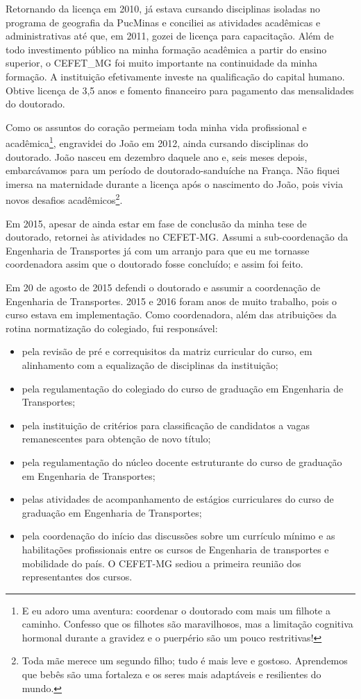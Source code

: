 \documentclass[
]{book}
\begin{document}
Retornando da licença em 2010, já estava cursando disciplinas isoladas
no programa de geografia da PucMinas e conciliei as atividades
acadêmicas e administrativas até que, em 2011, gozei de licença para
capacitação. Além de todo investimento público na minha formação
acadêmica a partir do ensino superior, o CEFET\_MG foi muito importante
na continuidade da minha formação. A instituição efetivamente investe na
qualificação do capital humano. Obtive licença de 3,5 anos e fomento
financeiro para pagamento das mensalidades do doutorado.

Como os assuntos do coração permeiam toda minha vida profissional e
acadêmica\footnote{E eu adoro uma aventura: coordenar o doutorado com mais
  um filhote a caminho. Confesso que os filhotes são maravilhosos, mas
  a limitação cognitiva hormonal durante a gravidez e o puerpério são
  um pouco restritivas!}, engravidei do João em 2012, ainda cursando
disciplinas do doutorado. João nasceu em dezembro daquele ano e, seis
meses depois, embarcávamos para um período de doutorado-sanduíche na
França. Não fiquei imersa na maternidade durante a licença após o
nascimento do João, pois vivia novos desafios acadêmicos\footnote{Toda mãe merece um segundo filho; tudo é mais leve e
  gostoso. Aprendemos que bebês são uma fortaleza e os seres mais
  adaptáveis e resilientes do mundo.}.

Em 2015, apesar de ainda estar em fase de conclusão da minha tese de
doutorado, retornei às atividades no CEFET-MG. Assumi a sub-coordenação
da Engenharia de Transportes já com um arranjo para que eu me tornasse
coordenadora assim que o doutorado fosse concluído; e assim foi feito.

Em 20 de agosto de 2015 defendi o doutorado e assumir a coordenação de
Engenharia de Transportes. 2015 e 2016 foram anos de muito trabalho,
pois o curso estava em implementação. Como coordenadora, além das
atribuições da rotina normatização do colegiado, fui responsável:

\begin{itemize}
\item
  pela revisão de pré e correquisitos da matriz curricular do curso,
  em alinhamento com a equalização de disciplinas da instituição;
\item
  pela regulamentação do colegiado do curso de graduação em Engenharia
  de Transportes;
\item
  pela instituição de critérios para classificação de candidatos a
  vagas remanescentes para obtenção de novo título;
\item
  pela regulamentação do núcleo docente estruturante do curso de
  graduação em Engenharia de Transportes;
\item
  pelas atividades de acompanhamento de estágios curriculares do curso
  de graduação em Engenharia de Transportes;
\item
  pela coordenação do início das discussões sobre um currículo mínimo
  e as habilitações profissionais entre os cursos de Engenharia de
  transportes e mobilidade do país. O CEFET-MG sediou a primeira
  reunião dos representantes dos cursos.
\end{itemize}
\end{document}
